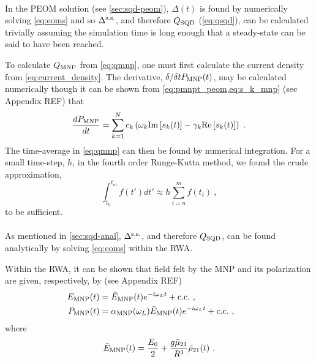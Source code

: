 \\

In the PEOM solution (see
\cref{sec:sqd-peom}), $\Delta(t)$ is found by numerically solving
\cref{eq:eoms} and so $\Delta^\text{s.s.}$, and therefore $Q_\text{SQD}$ (\cref{eq:qsqd}), can
be calculated trivially assuming the simulation time is long enough that a
steady-state can be said to have been reached.

To calculate $Q_\text{MNP}$ from
\cref{eq:qmnp}, one must first calculate the current density from
\cref{eq:current_density}. The derivative, $\delta/\delta tP_\text{MNP}(t)$, may be
calculated numerically though it can be shown from
\cref{eq:pmnpt_peom,eq:s_k_mnp} (see Appendix REF) that
%
\begin{equation}
    \frac{d\pmnp}{d t} = \sum_{k=1}^N c_k \left(
    \omega_k\imag{s_k(t)}
        -\gamma_k\real{s_k(t)}\right) \ .
    \label{eq:dpdt}
\end{equation}
%
The time-average in \cref{eq:qmnp} can then be found by numerical
integration. For a small time-step, $h$, in the fourth order Runge-Kutta
method, we found the crude approximation,
%
\begin{equation}
    \int_{t_n}^{t_m} f(t')dt' \approx h \sum_{i=n}^{m} f(t_i) \ ,
    \label{eq:numerical_int}
\end{equation}
%
to be sufficient.\\

\\

As mentioned in \cref{sec:sqd-anal}, $\Delta^\text{s.s.}$, and therefore $Q_\text{SQD}$, can be
found analytically by solving \cref{eq:eoms} within the RWA.

Within the RWA, it can be shown that field felt by the MNP and its polarization
are given, respectively, by (see Appendix REF)
%
\begin{align}
    \emnp(t) &= \bemnp(t)
    e^{-i\omega_L t} + \text{c.c.} \ ,\label{eq:emnp_rwa} \\
    \pmnp(t) &= \epsb \alphamnp(\omega_L)\bemnp(t)
    e^{-i\omega_L t} + \text{c.c.} \ , \label{eq:pmnp_rwa}
    \qquad
\end{align}
%
where
%
\begin{equation}
    \bemnp(t) = \frac{E_0}{2} + \frac{g\mut}{\epsb R^3}\bar\rho_{21}(t) \ .
    \label{eq:emnp_bar}
\end{equation}

